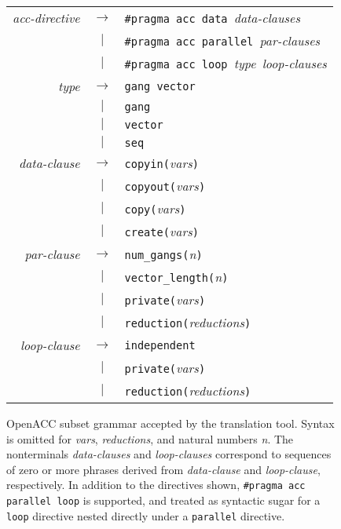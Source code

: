 \documentclass{sig-alternate-05-2015}
\begin{document}
\begin{figure}
\begin{tabular}{rcl}
\textit{acc-directive} &$\rightarrow$& \texttt{\#pragma acc data\ }\textit{data-clauses} \\
                       &     $|$     & \texttt{\#pragma acc parallel}\texttt{\ }\textit{par-clauses} \\
                       &     $|$     & \texttt{\#pragma acc loop\ }\textit{type}\texttt{\ }\textit{loop-clauses} \\
\textit{type}          &$\rightarrow$& \texttt{gang vector} \\
                       &     $|$     & \texttt{gang} \\
                       &     $|$     & \texttt{vector} \\
                       &     $|$     & \texttt{seq} \\
\textit{data-clause}   &$\rightarrow$& \texttt{copyin(}\textit{vars}\texttt{)} \\
                       &     $|$     & \texttt{copyout(}\textit{vars}\texttt{)} \\
                       &     $|$     & \texttt{copy(}\textit{vars}\texttt{)} \\
                       &     $|$     & \texttt{create(}\textit{vars}\texttt{)} \\
\textit{par-clause}&$\rightarrow$&\texttt{num\_gangs(}\textit{n}\texttt{)} \\
                       &     $|$     & \texttt{vector\_length(}\textit{n}\texttt{)} \\
                       &     $|$     & \texttt{private(}\textit{vars}\texttt{)} \\
                       &     $|$     & \texttt{reduction(}\textit{reductions}\texttt{)} \\
\textit{loop-clause}   &$\rightarrow$& \texttt{independent} \\
                       &     $|$     & \texttt{private(}\textit{vars}\texttt{)} \\
                       &     $|$     & \texttt{reduction(}\textit{reductions}\texttt{)} \\
\end{tabular}
\caption{OpenACC subset grammar accepted by the translation tool.  Syntax is
omitted for \textit{vars}, \textit{reductions}, and natural numbers \textit{n}.
The nonterminals \textit{data-clauses} and \textit{loop-clauses} correspond to
sequences of zero or more phrases derived from \textit{data-clause} and
\textit{loop-clause}, respectively.  In addition to the directives shown,
\texttt{\#pragma acc parallel loop} is supported, and treated as syntactic
sugar for a \texttt{loop} directive nested directly under a \texttt{parallel}
directive.}
\label{fig:grammar}
\end{figure}
\end{document}
